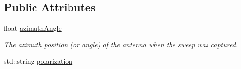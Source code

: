 \subsection*{Public Attributes}
\begin{DoxyCompactItemize}
\item 
\mbox{\label{structSweep_a1400ee785843eba210c37a8f7e24c941}} 
float \hyperlink{structSweep_a1400ee785843eba210c37a8f7e24c941}{azimuth\+Angle}
\begin{DoxyCompactList}\small\item\em The azimuth position (or angle) of the antenna when the sweep was captured. \end{DoxyCompactList}\item 
std\+::string \hyperlink{structSweep_a3484c258fdff60e1c109df92a1ba9ae7}{polarization}
\end{DoxyCompactItemize}
